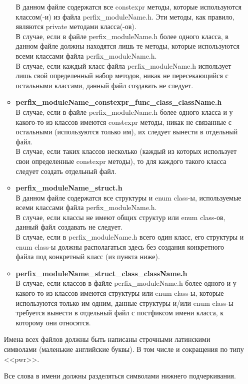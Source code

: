\begin{enumerate}
\begin{itemize}
		В данном файле содержатся все constexpr методы, которые используются классом(-и) из файла perfix\_moduleName.h. Эти методы, как правило, являются private методами класса(-ов).\\
		В случае, если в файле perfix\-\_module\-Name.h более одного класса, в данном файле должны находятся лишь те методы, которые используются всеми классами файла perfix\-\_module\-Name.h.\\
		В случае, если каждый класс файла perfix\_moduleName.h использует лишь свой определенный набор методов, никак не пересекающийся с остальными классами, данный файл создавать не следует.
		\item \textbf{perfix\-\_moduleName\-\_constexpr\-\_func\-\_class\-\_class\-Name.h}\\
		В случае, если в файле perfix\_moduleName.h более одного класса и у какого-то из классов имеются constexpr методы, никак не связанные с остальными (используются только им), их следует вынести в отдельный файл.\\
		В случае, если таких классов несколько (каждый из которых использует свои определенные constexpr методы), то для каждого такого класса следует создать отдельный файл.
		\item \textbf{perfix\_moduleName\_struct.h}\\		
		В данном файле содержатся все структуры и enum class-ы, используемые всеми классами файла perfix\_moduleName.h.\\		
		В случае, если классы не имеют общих структур или enum class-ов, данный файл создавать не следует.\\		
		В случае, если в perfix\_moduleName.h всего один класс, его структуры и enum class-ы должны располагаться здесь без создания конкретного файла под конкретный класс (из пункта ниже).
		\item \textbf{perfix\_moduleName\_struct\_class\_className.h}\\		
		В случае, если классов в файле perfix\_moduleName.h более одного и у какого-то из классов имеются структуры или enum class-ы, которые используются только им одним, данные структуры и/или enum class-ы требуется вынести в отдельный файл с постфиксом имени класса, к которому они относятся.
	\end{itemize}

	Имена всех файлов должны быть написаны строчными латинскими символами (маленькие английские буквы). В том числе и сокращения по типу <<pwr>>.
	
	Все слова в имени должны разделяться символами нижнего подчеркивания. 
	

\end{enumerate}
